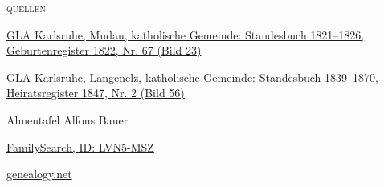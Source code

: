 \begin{person}[
    surname = {Galm},
    givenname = {Johann Josef},
    suffix = {1822--1887},
    label = {@I146@}
    ]
\begin{itemize}
\end{itemize}
\medbreak
\textsc{{quellen}}
\begin{enumerate}[label={[\arabic*]}]
\item \href{http://www.landesarchiv-bw.de/plink/?f=4-1119445-23}{GLA Karlsruhe, Mudau, katholische Gemeinde: Standesbuch 1821–1826, Geburtenregister 1822, Nr. 67 (Bild 23)}
\item \href{http://www.landesarchiv-bw.de/plink/?f=4-1119438-56}{GLA Karlsruhe, Langenelz, katholische Gemeinde: Standesbuch 1839–1870, Heiratsregister 1847, Nr. 2 (Bild 56)}
\item Ahnentafel Alfons Bauer
\item \href{https://www.familysearch.org/tree/person/details/LVN5-MSZ}{FamilySearch, ID: LVN5-MSZ}
\item \href{http://gedbas.genealogy.net/person/show/1172977598}{genealogy.net}
\end{enumerate}

\end{person}

